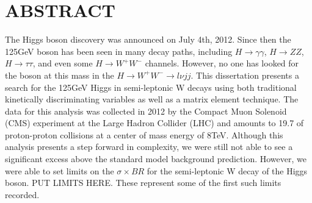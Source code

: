 %
%
%

\chapter*{ABSTRACT}

\pagestyle{plain} %
\setcounter{page}{2}

\indent The Higgs boson discovery was announced on July 4th, 2012. Since then the 125\unit{\GeV} boson has been seen in many decay paths, including $H{\rightarrow}\gamma\gamma$, $H{\rightarrow}ZZ$, $H{\rightarrow}\tau\tau$, and even some $H{\rightarrow}W^{+}W^{-}$ channels.
However, no one has looked for the boson at this mass in the $H{\rightarrow}W^{+}W^{-}{\rightarrow}l{\nu}jj$.
This dissertation presents a search for the 125\unit{\GeV} Higgs in semi-leptonic W decays using both traditional kinetically discriminating variables as well as a matrix element technique.
The data for this analysis was collected in 2012 by the Compact Muon Solenoid (CMS) experiment at the Large Hadron Collider (LHC) and amounts to 19.7\unit{\fbinv} of proton-proton collisions at a center of mass energy of 8\unit{\TeV}.
Although this analysis presents a step forward in complexity, we were still not able to see a significant excess above the standard model background prediction.
However, we were able to set limits on the $\sigma\times{BR}$ for the semi-leptonic W decay of the Higgs boson.
PUT LIMITS HERE.
These represent some of the first such limits recorded.


 

\pagebreak{}



